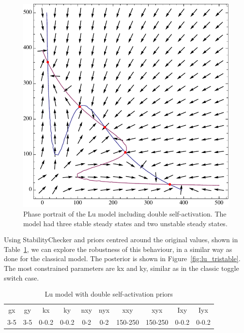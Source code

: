 \begin{figure}[p]
\centering
\includegraphics[scale=0.7]{chapterModelling/images/Lu/mae/selfactivation.pdf}
\caption[Phase portrait of the Lu model including double self-activation]{Phase portrait of the Lu model including double self-activation. The model had three stable steady states and two unstable steady states.}
\label{fig:lu_tri_phse}
\end{figure}

Using StabilityChecker and priors centred around the original values, shown in Table~\ref{tab:lu_dp_pr}, we can explore the robustness of this behaviour, in a similar way as done for the classical model. The posterior is shown in Figure~\ref{fig:lu_tristable}. The most constrained parameters are kx and ky, similar as in the classic toggle switch case.

\clearpage
\begin{table}[p]
\centering
\caption{Lu model with double self-activation priors}
\label{tab:lu_dp_pr}
\begin{tabular}{cccccccccc}
gx    & gy    & kx    & ky    & nxy & nyx & xxy     & xyx     & Ixy   & Iyx \\
3-5 & 3-5 & 0-0.2 & 0-0.2 & 0-2 & 0-2 & 150-250 & 150-250 & 0-0.2 &   0-0.2 
\end{tabular}
\end{table}

